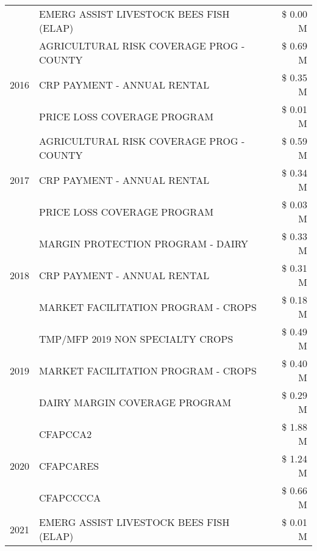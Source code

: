 \begin{tabular}{llr}
 & EMERG ASSIST LIVESTOCK BEES FISH (ELAP) & \$ 0.00 M \\
\cline{1-3}
\multirow[t]{3}{*}{2016} & AGRICULTURAL RISK COVERAGE PROG - COUNTY & \$ 0.69 M \\
 & CRP PAYMENT - ANNUAL RENTAL & \$ 0.35 M \\
 & PRICE LOSS COVERAGE PROGRAM & \$ 0.01 M \\
\cline{1-3}
\multirow[t]{3}{*}{2017} & AGRICULTURAL RISK COVERAGE PROG - COUNTY & \$ 0.59 M \\
 & CRP PAYMENT - ANNUAL RENTAL & \$ 0.34 M \\
 & PRICE LOSS COVERAGE PROGRAM & \$ 0.03 M \\
\cline{1-3}
\multirow[t]{3}{*}{2018} & MARGIN PROTECTION PROGRAM - DAIRY & \$ 0.33 M \\
 & CRP PAYMENT - ANNUAL RENTAL & \$ 0.31 M \\
 & MARKET FACILITATION PROGRAM - CROPS & \$ 0.18 M \\
\cline{1-3}
\multirow[t]{3}{*}{2019} & TMP/MFP 2019 NON SPECIALTY CROPS & \$ 0.49 M \\
 & MARKET FACILITATION PROGRAM - CROPS & \$ 0.40 M \\
 & DAIRY MARGIN COVERAGE PROGRAM & \$ 0.29 M \\
\cline{1-3}
\multirow[t]{3}{*}{2020} & CFAPCCA2 & \$ 1.88 M \\
 & CFAPCARES & \$ 1.24 M \\
 & CFAPCCCCA & \$ 0.66 M \\
\cline{1-3}
2021 & EMERG ASSIST LIVESTOCK BEES FISH (ELAP) & \$ 0.01 M \\
\cline{1-3}
\bottomrule
\end{tabular}
